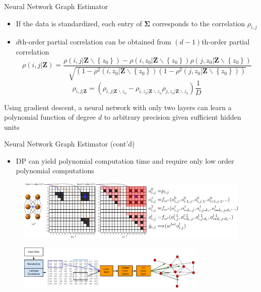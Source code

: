 \documentclass{beamer}
\begin{document}
\begin{frame}{Neural Network Graph Estimator}
  \begin{itemize}
    \item If the data is standardized, each entry of $\mathbf{\Sigma}$
      corresponds to the correlation $\rho_{i,j}$
    \item $d$th-order partial correlation can be obtained from
      $(d-1)$th-order partial correlation
      \[
        \rho ( i , j | \mathbf { Z } ) = \frac { \rho ( i , j | \mathbf { Z } \backslash \left\{ z _ { 0 } \right\} ) - \rho \left( i , z _ { 0 } | \mathbf { Z } \backslash \left\{ z _ { 0 } \right\} \right) \rho \left( j , z _ { 0 } | \mathbf { Z } \backslash \left\{ z _ { 0 } \right\} \right) } { \sqrt { \left( 1 - \rho ^ { 2 } \left( i , z _ { 0 } | \mathbf { Z } \backslash \left\{ z _ { 0 } \right\} \right) \left( 1 - \rho ^ { 2 } \left( j , z _ { 0 } | \mathbf { Z } \backslash \left\{ z _ { 0 } \right\} \right) \right) \right. } }
      \]
      \[
        \rho_{i,j|\mathbf{Z}}=(\rho_{i,j|\mathbf{Z}\backslash{z_o}}-\rho_{i,z_o|\mathbf{Z}\backslash{z_o}}\rho_{j,z_o|\mathbf{Z}\backslash{z_o}})\frac{1}{D}
      \]
    \end{itemize}
    \begin{block}{}
      Using gradient descent, a neural network with only two layers can learn a polynomial function of degree $d$ to arbitrary precision given sufficient hidden units \citep{andoni2014learning}
    \end{block}
\end{frame}
\begin{frame}{Neural Network Graph Estimator (cont'd)}
  \begin{itemize}
    \item DP can yield polynomial computation time and require only low order polynomial computations
  \end{itemize}
  \begin{figure}[ht]
    \centering
    \includegraphics[width=1\textwidth,keepaspectratio]{img/dnet}
    \caption*{\label{fig:dnet}}
  \end{figure}
  \vspace{-1cm}
  \begin{figure}[ht]
    \centering
    \includegraphics[width=0.8\textwidth,keepaspectratio]{img/workflow}
    \caption*{\label{fig:workflow}}
  \end{figure}
\end{frame}
\end{document}
